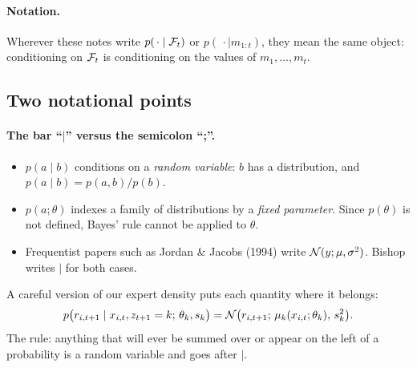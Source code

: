 \paragraph{Notation.} Wherever these notes write $p(\,\cdot\mid\mathcal{F}_t)$ or $p(\,\cdot\mid m_{1:t})$, they mean the same object: conditioning on $\mathcal{F}_t$ is conditioning on the values of $m_1,\dots,m_t$.

\subsection{Two notational points}

\paragraph{The bar ``$\mid$'' versus the semicolon ``;''.}
\begin{itemize}
  \item $p(a\mid b)$ conditions on a \emph{random variable}: $b$ has a distribution, and $p(a\mid b)=p(a,b)/p(b)$.
  \item $p(a;\theta)$ indexes a family of distributions by a \emph{fixed parameter}. Since $p(\theta)$ is not defined, Bayes' rule cannot be applied to $\theta$.
  \item Frequentist papers such as Jordan \& Jacobs (1994) write $\mathcal{N}(y;\mu,\sigma^2)$. Bishop writes $\mid$ for both cases.
\end{itemize}
A careful version of our expert density puts each quantity where it belongs:
\begin{equation}
p\big(r_{i,t+1}\mid x_{i,t},z_{t+1}=k;\,\theta_k,s_k\big)=\mathcal{N}\big(r_{i,t+1};\,\mu_k(x_{i,t};\theta_k),\,s_k^2\big).
\end{equation}
The rule: anything that will ever be summed over or appear on the left of a probability is a random variable and goes after $\mid$.

